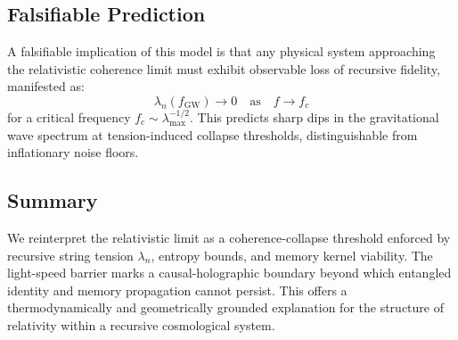 \subsection*{Falsifiable Prediction}

A falsifiable implication of this model is that any physical system approaching the relativistic coherence limit must exhibit observable loss of recursive fidelity, manifested as:
\[
\lambda_n(f_{\text{GW}}) \to 0 \quad \text{as} \quad f \to f_c
\]
for a critical frequency \( f_c \sim \lambda_{\text{max}}^{-1/2} \). This predicts sharp dips in the gravitational wave spectrum at tension-induced collapse thresholds, distinguishable from inflationary noise floors.

\subsection*{Summary}

We reinterpret the relativistic limit as a coherence-collapse threshold enforced by recursive string tension \( \lambda_n \), entropy bounds, and memory kernel viability. The light-speed barrier marks a causal-holographic boundary beyond which entangled identity and memory propagation cannot persist. This offers a thermodynamically and geometrically grounded explanation for the structure of relativity within a recursive cosmological system.
